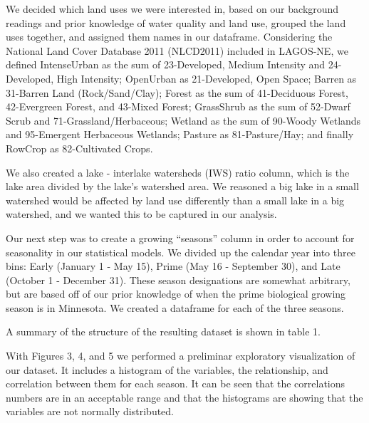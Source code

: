 \documentclass[12pt,]{article}
\begin{document}
We decided which land uses we were interested in, based on our
background readings and prior knowledge of water quality and land use,
grouped the land uses together, and assigned them names in our
dataframe. Considering the National Land Cover Database 2011 (NLCD2011)
included in LAGOS-NE, we defined IntenseUrban as the sum of
23-Developed, Medium Intensity and 24-Developed, High Intensity;
OpenUrban as 21-Developed, Open Space; Barren as 31-Barren Land
(Rock/Sand/Clay); Forest as the sum of 41-Deciduous Forest, 42-Evergreen
Forest, and 43-Mixed Forest; GrassShrub as the sum of 52-Dwarf Scrub and
71-Grassland/Herbaceous; Wetland as the sum of 90-Woody Wetlands and
95-Emergent Herbaceous Wetlands; Pasture as 81-Pasture/Hay; and finally
RowCrop as 82-Cultivated Crops.

We also created a lake - interlake watersheds (IWS) ratio column, which
is the lake area divided by the lake's watershed area. We reasoned a big
lake in a small watershed would be affected by land use differently than
a small lake in a big watershed, and we wanted this to be captured in
our analysis.

Our next step was to create a growing ``seasons'' column in order to
account for seasonality in our statistical models. We divided up the
calendar year into three bins: Early (January 1 - May 15), Prime (May 16
- September 30), and Late (October 1 - December 31). These season
designations are somewhat arbitrary, but are based off of our prior
knowledge of when the prime biological growing season is in Minnesota.
We created a dataframe for each of the three seasons.

A summary of the structure of the resulting dataset is shown in table 1.

With Figures 3, 4, and 5 we performed a preliminar exploratory
visualization of our dataset. It includes a histogram of the variables,
the relationship, and correlation between them for each season. It can
be seen that the correlations numbers are in an acceptable range and
that the histograms are showing that the variables are not normally
distributed.
\end{document}
